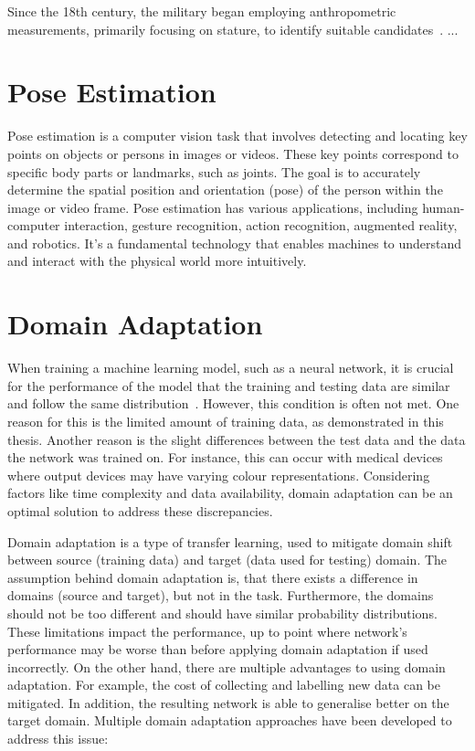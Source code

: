 Since the 18th century, the military began employing anthropometric measurements, primarily focusing on stature, to identify suitable candidates~\cite{anthrohistory}.
...
\section{Pose Estimation}
Pose estimation is a computer vision task that involves detecting and locating key points on objects or persons in images or videos. These key points correspond to specific body parts or landmarks, such as joints. The goal is to accurately determine the spatial position and orientation (pose) of the person within the image or video frame. Pose estimation has various applications, including human-computer interaction, gesture recognition, action recognition, augmented reality, and robotics. It's a fundamental technology that enables machines to understand and interact with the physical world more intuitively. 








\section{Domain Adaptation}
When training a machine learning model, such as a neural network, it is crucial for the performance of the model that the training and testing data are similar and follow the same distribution~\cite{domainAdaptation}. However, this condition is often not met. One reason for this is the limited amount of training data, as demonstrated in this thesis. Another reason is the slight differences between the test data and the data the network was trained on. For instance, this can occur with medical devices where output devices may have varying colour representations. Considering factors like time complexity and data availability, domain adaptation can be an optimal solution to address these discrepancies.

Domain adaptation is a type of transfer learning, used to mitigate domain shift between source (training data) and target (data used for testing) domain.  The assumption behind domain adaptation is, that there exists a difference in domains (source and target), but not in the task. Furthermore, the domains should not be too different and should have similar probability distributions. These limitations impact the performance, up to point where network's performance may be worse than before applying domain adaptation if used incorrectly. On the other hand, there are multiple advantages to using domain adaptation. For example, the cost of collecting and labelling new data can be mitigated. In addition, the resulting network is able to generalise better on the target domain. Multiple domain adaptation approaches have been developed to address this issue:





